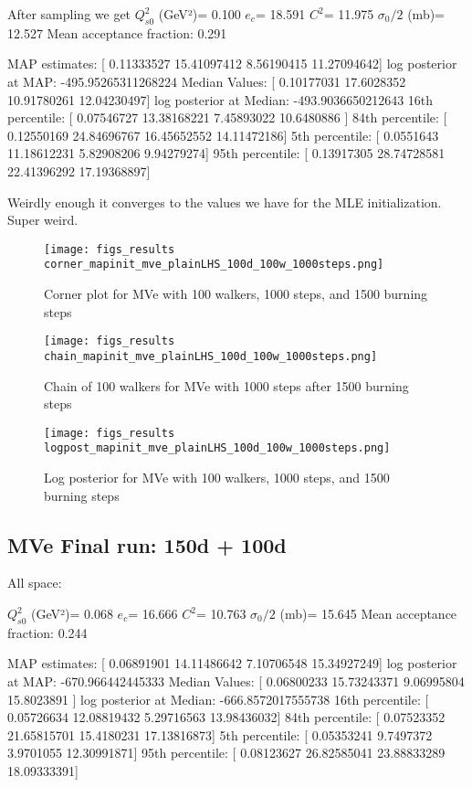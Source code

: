 \documentclass{article}
\begin{document}
After sampling we get
$Q_{s0}^{2}$ (GeV²)= 0.100
$e_c$= 18.591
$C^{2}$= 11.975
$\sigma_0/2$ (mb)= 12.527
Mean acceptance fraction: 0.291

MAP estimates:  [ 0.11333527 15.41097412  8.56190415 11.27094642]
log posterior at MAP:  -495.95265311268224
Median Values:  [ 0.10177031 17.6028352  10.91780261 12.04230497]
log posterior at Median:  -493.9036650212643
16th percentile:  [ 0.07546727 13.38168221  7.45893022 10.6480886 ]
84th percentile:  [ 0.12550169 24.84696767 16.45652552 14.11472186]
5th percentile:  [ 0.0551643  11.18612231  5.82908206  9.94279274]
95th percentile:  [ 0.13917305 28.74728581 22.41396292 17.19368897]

Weirdly enough it converges to the values we have for the MLE initialization. Super weird. 

\begin{figure}
    \centering
    \texttt{[image: figs\_results\\corner\_mapinit\_mve\_plainLHS\_100d\_100w\_1000steps.png]}
    \label{fig:corner_mve_plainLHS_100d_100w_1000steps}
    \caption{Corner plot for MVe with 100 walkers, 1000 steps, and 1500 burning steps}
    \end{figure}
    
\begin{figure}
    \centering
    \texttt{[image: figs\_results\\chain\_mapinit\_mve\_plainLHS\_100d\_100w\_1000steps.png]}
    \label{fig:chain_mve_plainLHS_100d_100w_1000steps}
    \caption{Chain of 100 walkers for MVe with 1000 steps after 1500 burning steps}
    \end{figure}
    
\begin{figure}
    \centering
    \texttt{[image: figs\_results\\logpost\_mapinit\_mve\_plainLHS\_100d\_100w\_1000steps.png]}
    \label{fig:logpost_mve_plainLHS_100d_100w_1000steps}
    \caption{Log posterior for MVe with 100 walkers, 1000 steps, and 1500 burning steps}
    \end{figure}

\subsection{MVe Final run: 150d + 100d}

All space:

$Q_{s0}^{2}$ (GeV²)= 0.068
$e_c$= 16.666
$C^{2}$= 10.763
$\sigma_0/2$ (mb)= 15.645
Mean acceptance fraction: 0.244

MAP estimates:  [ 0.06891901 14.11486642  7.10706548 15.34927249]
log posterior at MAP:  -670.966442445333
Median Values:  [ 0.06800233 15.73243371  9.06995804 15.8023891 ]
log posterior at Median:  -666.8572017555738
16th percentile:  [ 0.05726634 12.08819432  5.29716563 13.98436032]
84th percentile:  [ 0.07523352 21.65815701 15.4180231  17.13816873]
5th percentile:  [ 0.05353241  9.7497372   3.9701055  12.30991871]
95th percentile:  [ 0.08123627 26.82585041 23.88833289 18.09333391]
\end{document}
